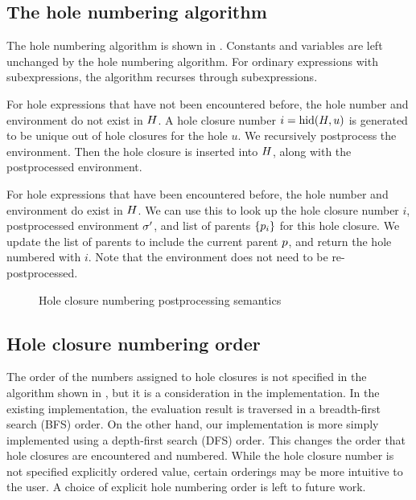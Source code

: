 \subsection{The hole numbering algorithm}
\label{sec:hole-numbering-algorithm}

The hole numbering algorithm is shown in . Constants and variables are left unchanged by the hole numbering algorithm. For ordinary expressions with subexpressions, the algorithm recurses through subexpressions.

For hole expressions that have not been encountered before, the hole number and environment do not exist in $H$. A hole closure number $i=\operatorname{hid}(H,u)$ is generated to be unique out of hole closures for the hole $u$. We recursively postprocess the environment. Then the hole closure is inserted into $H$, along with the postprocessed environment.

For hole expressions that have been encountered before, the hole number and environment do exist in $H$. We can use this to look up the hole closure number $i$, postprocessed environment $\sigma'$, and list of parents $\{p_i\}$ for this hole closure. We update the list of parents to include the current parent $p$, and return the hole numbered with $i$. Note that the environment does not need to be re-postprocessed.

\begin{figure}
  \centering
  \begin{mdframed}
    \begin{singlespace}
      
    \end{singlespace}
  \end{mdframed}
  \caption{Hole closure numbering postprocessing semantics}
  \label{fig:big-step-renumber-new-rules}
\end{figure}

\subsection{Hole closure numbering order}
\label{sec:numbering-order}

The order of the numbers assigned to hole closures is not specified in the algorithm shown in , but it is a consideration in the implementation. In the existing implementation, the evaluation result is traversed in a breadth-first search (BFS) order. On the other hand, our implementation is more simply implemented using a depth-first search (DFS) order. This changes the order that hole closures are encountered and numbered. While the hole closure number is not specified explicitly ordered value, certain orderings may be more intuitive to the user. A choice of explicit hole numbering order is left to future work.


